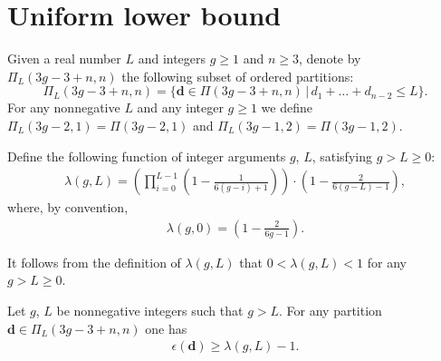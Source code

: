 \section{Uniform lower bound}\label{s:Uniform:lower:bound}

Given a real
number $L$ and integers $g\ge 1$ and $n\ge 3$, denote
by $\Pi_L(3g-3+n,n)$ the following subset
of ordered partitions:
\[
\Pi_L(3g-3+n,n)=\big\{\boldsymbol{d}\in\Pi(3g-3+n,n) \,\big|\, d_1+\dots+d_{n-2} \le L \big\} .
\]
For any nonnegative $L$ and any integer $g\ge 1$ we define
$\Pi_L(3g-2,1)=\Pi(3g-2,1)$ and
$\Pi_L(3g-1,2)=\Pi(3g-1,2)$.

Define the following function of integer arguments $g$, $L$, satisfying $g>L\ge 0$:
\begin{gather}
\label{eq:lambda}
\lambda(g,L)=\left(\prod_{i=0}^{L-1}\left(1-\frac{1}{6(g-i)+1}\right)\right)
\cdot\left(1-\frac{2}{6(g-L)-1}\right) ,
\end{gather}
where, by convention,
\begin{gather}
\label{eq:lambda:0}
\lambda(g,0)=\left(1-\frac{2}{6g-1}\right) .
\end{gather}

It follows from the definition of $\lambda(g,L)$ that $0<\lambda(g,L)<1$ for any $g>L\ge 0$.

\begin{Theorem}\label{th:Main:Theorem}
Let $g$, $L$ be nonnegative integers such that $g>L$. For any partition
$\boldsymbol{d}\in\Pi_{L}(3g-3+n,n)$ one has
\begin{gather}
\label{eq:1:plus:epsilon:samller:than:lambda}
\epsilon(\boldsymbol{d})\ge\lambda(g,L)-1 .
\end{gather}
\end{Theorem}
